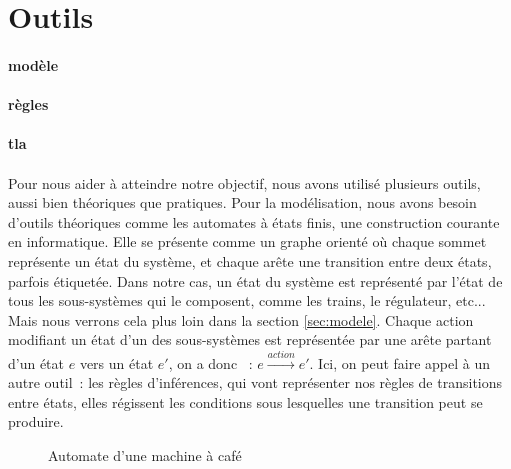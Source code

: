 \documentclass[oneside, a4paper, 11pt]{book}
\begin{document}
\section{Outils}

\paragraph{modèle}
\paragraph{règles}
\paragraph{tla}



\paragraph{}
Pour nous aider à atteindre notre objectif, nous avons utilisé plusieurs outils, aussi bien théoriques que pratiques.
Pour la modélisation, nous avons besoin d'outils théoriques comme les automates à états finis, une construction courante en informatique. Elle se présente comme un graphe orienté
où chaque sommet représente un état du système, et chaque arête une transition entre deux états, parfois étiquetée.
Dans notre cas, un état du système est représenté par l'état de tous les sous-systèmes qui le composent, comme les trains, le régulateur, etc... 
Mais nous verrons cela plus loin dans la section \ref{sec:modele}.
Chaque action modifiant un état d'un des sous-systèmes est représentée par une arête partant d'un état $e$ vers un état $e'$, on a donc ~: $e \xrightarrow{action} e'$.
Ici, on peut faire appel à un autre outil~: les règles d'inférences, qui vont représenter nos règles de transitions entre états, elles régissent les conditions sous lesquelles une transition peut se produire.

\begin{figure}
	\centering
	\caption{Automate d'une machine à café}
	\label{fig:cafe}
\end{figure}
\end{document}
